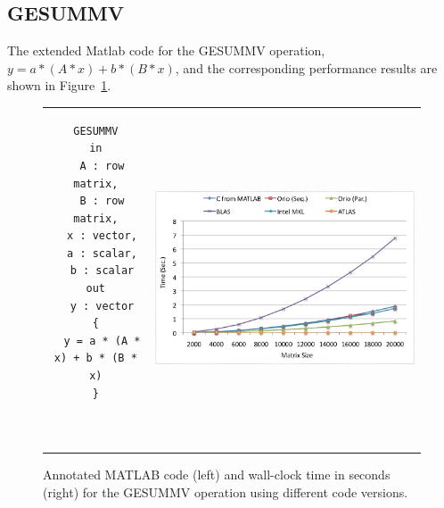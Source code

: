 \documentclass[11pt]{article}
\begin{document}
\subsection{GESUMMV}


The extended Matlab code for the GESUMMV operation, $y = a * (A * x) + b * (B * x)$,
and the corresponding performance results are shown in Figure~\ref{fig:gesummv}.



\begin{figure}[htp]
\centering
\begin{tabular}{cc}
\begin{minipage}[b]{.3\textwidth}
\footnotesize
\begin{verbatim}
GESUMMV
in
  A : row matrix,
  B : row matrix,
  x : vector,
  a : scalar,
  b : scalar
out
  y : vector
{
  y = a * (A * x) + b * (B * x)
}



\end{verbatim}
\end{minipage}
&
\begin{minipage}[b]{.6\textwidth}
\includegraphics[width=\textwidth]{figures/gesummv.png}
\end{minipage}\\
\end{tabular}
\caption{Annotated MATLAB code (left) and wall-clock time in seconds (right) for the GESUMMV operation using different code versions.}
\label{fig:gesummv}
\end{figure}
\end{document}
